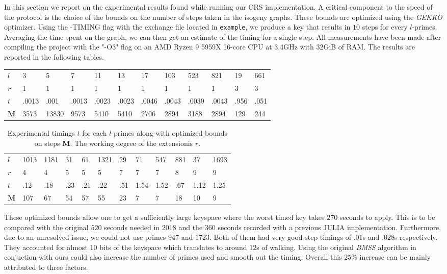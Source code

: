 \documentclass[../main.tex]{subfiles}
\begin{document}
In this section we report on the experimental results found while running our CRS implementation.
A critical component to the speed of the protocol is the choice of the bounds on the number of steps taken in the isogeny graphs.
These bounds are optimized using the \textit{GEKKO} optimizer.
Using the -TIMING flag with the exchange file located in \texttt{example}, we produce a key that results in $10$ steps for every $l$-primes.
Averaging the time spent on the graph, we can then get an estimate of the timing for a single step.
All measurements have been made after compiling the project with the "-O3" flag on an AMD Ryzen 9 5959X 16-core CPU at 3.4GHz with 32GiB of RAM.
The results are reported in the following tables.

\begin{table}[h]
\begin{tabular}{llllllllllll}
\cline{1-1}
\multicolumn{1}{|l|}{$l$} & 3     & 5     & 7     & 11    & 13    & 17    & 103   & 523   & 821   & 19   & 661  \\ \cline{1-1}
$r$                       & 1     & 1     & 1     & 1     & 1     & 1     & 1     & 1     & 1     & 3    & 3    \\
$t$                       & .0013 & .001  & .0013 & .0023 & .0023 & .0046 & .0043 & .0039 & .0043 & .956 & .051 \\
$\mathbf{M}$              & 3573  & 13830 & 9573  & 5410  & 5410  & 2706  & 2894  & 3188  & 2894  & 129  & 244
\end{tabular}
\end{table}
\begin{table}[h]
\begin{tabular}{llllllllllll}
\cline{1-1}
\multicolumn{1}{|l|}{$l$} & 1013 & 1181 & 31  & 61  & 1321 & 29  & 71   & 547  & 881 & 37   & 1693 \\ \cline{1-1}
$r$                       & 4    & 4    & 5   & 5   & 5    & 7   & 7    & 7    & 8   & 9    & 9    \\
$t$                       & .12  & .18  & .23 & .21 & .22  & .51 & 1.54 & 1.52 & .67 & 1.12 & 1.25 \\
$\mathbf{M}$              & 107  & 67   & 54  & 57  & 55   & 23  & 7    & 7    & 18  & 10   & 9
\end{tabular}
	\caption{Experimental timings $t$ for each $l$-primes along with optimized bounds on steps $\mathbf{M}$. The working degree of the extensionis $r$.}
\end{table}
These optimized bounds allow one to get a sufficiently large keyspace where the worst timed key takes $270$ seconds to apply.
This is to be compared with the original $520$ seconds needed in 2018 and the $360$ seconds recorded with a previous JULIA implementation.
Furthermore, due to an unresolved issue, we could not use primes $947$ and $1723$.
Both of them had very good step timings of $.01$s and $.028$s respectively.
They accounted for almost 10 bits of the keyspace which translates to around $12$s of walking.
Using the original \textit{BMSS} algorithm in conjuction with ours could also increase the number of primes used and smooth out the timing;
Overall this $25$\% increase can be mainly attributed to three factors.
\end{document}
